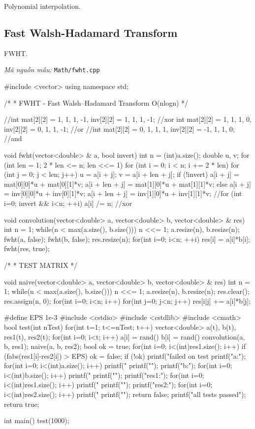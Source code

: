 \documentclass[11pt]{article}
\newcommand{\codepath}[1]{\par\noindent\textit{Mã nguồn mẫu:} \texttt{#1}\par}
\begin{document}
Polynomial interpolation.

\subsection{Fast Walsh-Hadamard Transform}

FWHT.

\codepath{Math/fwht.cpp}

\begingroup\scriptsize
\begin{vncode}
#include <vector>
using namespace std;

/*
 * FWHT - Fast Walsh–Hadamard Transform O(nlogn)
 */

//int mat[2][2] = {{1, 1}, {1, -1}}, inv[2][2] = {{1, 1}, {1, -1}}; //xor
int mat[2][2] = {{1, 1}, {1, 0}}, inv[2][2] = {{0, 1}, {1, -1}}; //or
//int mat[2][2] = {{0, 1}, {1, 1}}, inv[2][2] = {{-1, 1}, {1, 0}}; //and

void fwht(vector<double> & a, bool invert) {
	int n = (int)a.size();
	double u, v;
	for (int len = 1; 2 * len <= n; len <<= 1) {
		for (int i = 0; i < n; i += 2 * len) {
			for (int j = 0; j < len; j++) {
				u = a[i + j];
				v = a[i + len + j];
				if (!invert) {
					a[i + j] = mat[0][0]*u + mat[0][1]*v;
					a[i + len + j] = mat[1][0]*u + mat[1][1]*v;
				}
				else {
					a[i + j] = inv[0][0]*u + inv[0][1]*v;
					a[i + len + j] = inv[1][0]*u + inv[1][1]*v;
				}
			}
		}
	}
	//for (int i=0; invert && i<n; ++i) a[i] /= n; //xor
}

void convolution(vector<double> a, vector<double> b, vector<double> & res) {
	int n = 1;
	while(n < max(a.size(), b.size())) n <<= 1;
	a.resize(n), b.resize(n);
	fwht(a, false); fwht(b, false);
	res.resize(n);
	for(int i=0; i<n; ++i) res[i] = a[i]*b[i];
	fwht(res, true);
}

/*
 * TEST MATRIX
 */

void naive(vector<double> a, vector<double> b, vector<double> & res) {
	int n = 1;
	while(n < max(a.size(), b.size())) n <<= 1;
	a.resize(n), b.resize(n);
	res.clear(); res.assign(n, 0);
	for(int i=0; i<n; i++) {
		for(int j=0; j<n; j++) {
			res[i|j] += a[i]*b[j];
		}
	}
}

#define EPS 1e-3
#include <cstdio>
#include <cstdlib>
#include <cmath>
bool test(int nTest) {
	for(int t=1; t<=nTest; t++) {
		vector<double> a(t), b(t), res1(t), res2(t);
		for(int i=0; i<t; i++) {
			a[i] = rand()%
			b[i] = rand()%
		}
		convolution(a, b, res1);
		naive(a, b, res2);
		bool ok = true;
		for(int i=0; i<(int)res1.size(); i++) {
			if (fabs(res1[i]-res2[i]) > EPS) ok = false;
		}
		if (!ok) {
			printf("failed on test %
			printf("a:");
			for(int i=0; i<(int)a.size(); i++) {
				printf(" %
			}
			printf("\n");
			printf("b:");
			for(int i=0; i<(int)b.size(); i++) {
				printf(" %
			}
			printf("\n");
			printf("res1:");
			for(int i=0; i<(int)res1.size(); i++) {
				printf(" %
			}
			printf("\n");
			printf("res2:");
			for(int i=0; i<(int)res2.size(); i++) {
				printf(" %
			}
			printf("\n");
			return false;
		}
	}
	printf("all tests passed\n");
	return true;
}

int main() {
	test(1000);
}
\end{vncode}
\endgroup
\end{document}
